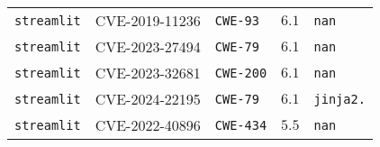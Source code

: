 \begin{table}
\begin{tabular}{lllll}
\texttt{streamlit} & CVE-2019-11236 & \texttt{CWE-93} & $6.1$ & \texttt{nan} \\
\texttt{streamlit} & CVE-2023-27494 & \texttt{CWE-79} & $6.1$ & \texttt{nan} \\
\texttt{streamlit} & CVE-2023-32681 & \texttt{CWE-200} & $6.1$ & \texttt{nan} \\
\texttt{streamlit} & CVE-2024-22195 & \texttt{CWE-79} & $6.1$ & \texttt{jinja2.} \\
\texttt{streamlit} & CVE-2022-40896 & \texttt{CWE-434} & $5.5$ & \texttt{nan} \\
\bottomrule
\end{tabular}
\end{table}
